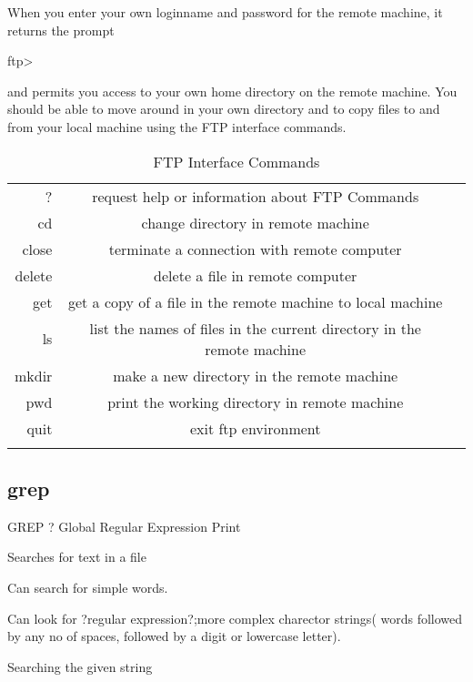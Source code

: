 \documentclass{article}
\begin{document}
When you enter your own loginname and password for the remote machine, it returns the prompt

\hspace{10mm}ftp>

and permits you access to your own home directory on the remote machine. You should be able to move around in your own directory and to copy files to and from your local machine using the FTP interface commands.

\begin{table}[htb]
\caption {FTP Interface Commands}
\label {Common Commands}
\begin{tabular}{rcc}
\noalign{\smallskip}\hline\hline\noalign{\smallskip}
? & request help or information about FTP Commands\\
cd & change directory in remote machine\\
close & terminate a connection with remote computer\\
delete & delete a file in remote computer\\
get & get a copy of a file in the remote machine to local machine\\
ls & list the names of files in the current directory in the remote machine\\
mkdir & make a new directory in the remote machine\\
pwd & print the working directory in remote machine\\
quit & exit ftp environment\\
\noalign{\smallskip}\hline\hline\noalign{\smallskip}

\end{tabular}
\end{table}

\subsection{grep}

GREP ? Global Regular Expression Print

 	\hspace{10mm}Searches for text in a file
	
 	\hspace{10mm}Can search for simple words.
	
 	\hspace{10mm}Can look for ?regular expression?;more complex charector strings( words followed by any no of spaces, followed by a digit or lowercase letter).


	Searching the given string
\end{document}
